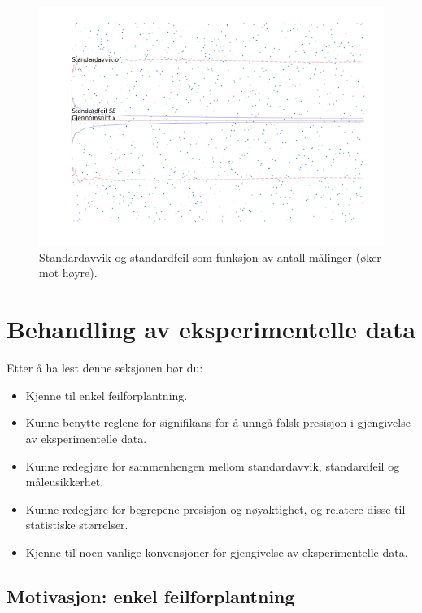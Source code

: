 \documentclass[a4paper,9pt]{article}
\begin{document}
\begin{figure}[h]
\centering
\includegraphics[width=\textwidth]{standard_n}
\caption{Standardavvik og standardfeil som funksjon av antall målinger (øker mot høyre).}
\end{figure}



 
\FloatBarrier

\pagebreak 
 
\section{Behandling av eksperimentelle data}

Etter å ha lest denne seksjonen bør du:
\begin{itemize}
\item Kjenne til enkel feilforplantning.
\item Kunne benytte reglene for signifikans for å unngå falsk presisjon i gjengivelse av eksperimentelle data.
\item Kunne redegjøre for sammenhengen mellom standardavvik, standardfeil og måleusikkerhet.
\item Kunne redegjøre for begrepene presisjon og nøyaktighet, og relatere disse til statistiske størrelser.
\item Kjenne til noen vanlige konvensjoner for gjengivelse av eksperimentelle data.
\end{itemize}

\subsection{Motivasjon: enkel feilforplantning}
\end{document}
